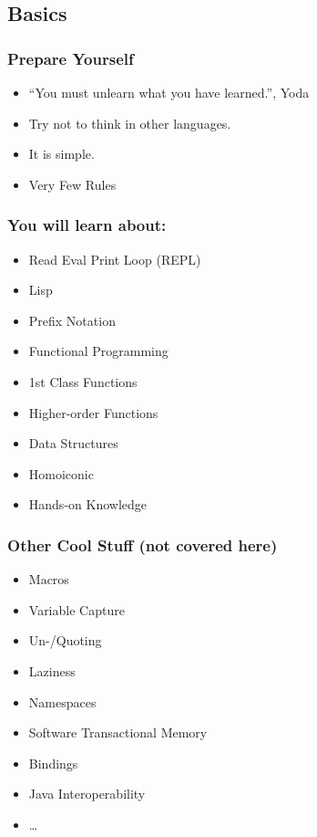 \documentclass{beamer}
\begin{document}
  \subsection{Basics}

  \begin{frame}
    \frametitle{Prepare Yourself}

    \begin{itemize}
      \item ``You must unlearn what you have learned.'', Yoda
      \item Try not to think in other languages.
      \item It is simple.
      \item Very Few Rules
    \end{itemize}
  \end{frame}

  \begin{frame}
      \frametitle{You will learn about:}

      \begin{itemize}
          \item Read Eval Print Loop (REPL)
          \item Lisp
          \item Prefix Notation
          \item Functional Programming
          \item 1st Class Functions
          \item Higher-order Functions
          \item Data Structures
          \item Homoiconic
          \item Hands-on Knowledge
      \end{itemize}
  \end{frame}

  \begin{frame}
      \frametitle{Other Cool Stuff (not covered here)}

      \begin{itemize}
          \item Macros
          \item Variable Capture
          \item Un-/Quoting
          \item Laziness
          \item Namespaces
          \item Software Transactional Memory
          \item Bindings
          \item Java Interoperability
          \item \ldots
      \end{itemize}
  \end{frame}
\end{document}
